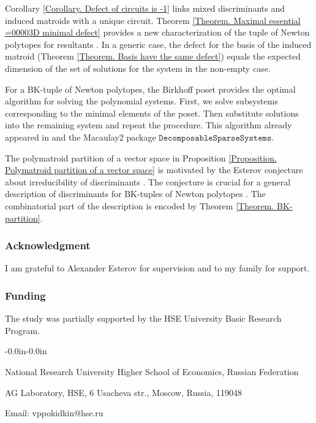 \documentclass[11pt]{article}
\theoremstyle{plain}
\theoremstyle{definition}
\theoremstyle{remark}
\theoremstyle{plain}
\theoremstyle{plain}
\theoremstyle{plain}
\theoremstyle{definition}
\begin{document}
Corollary \ref{Corollary. Defect of circuits is -1} links mixed discriminants
\cite{cattani_mixed_2013} and induced matroids with a unique circuit.
Theorem \ref{Theorem. Maximal essential =00003D minimal defect} provides
a new characterization of the tuple of Newton polytopes for resultants
\cite{sturmfels_newton_1994}. In a generic case, the defect for the
basis of the induced matroid (Theorem \ref{Theorem. Basis have the same defect})
equals the expected dimension of the set of solutions for the system
in the non-empty case.

For a BK-tuple of Newton polytopes, the Birkhoff poset provides the
optimal algorithm for solving the polynomial systems. First, we solve
subsystems corresponding to the minimal elements of the poset. Then
substitute solutions into the remaining system and repeat the procedure.
This algorithm already appeared in \cite{brysiewicz_solving_2021}
and the Macaulay2 package $\mathtt{DecomposableSparseSystems}$.

The polymatroid partition of a vector space in Proposition \ref{Proposition. Polymatroid partition of a vector space}
is motivated by the Esterov conjecture about irreducibility of discriminants
\cite{esterov_galois_2019,pokidkin_components_2025}. The conjecture
is crucial for a general description of discriminants for BK-tuples
of Newton polytopes \cite{pokidkin_components_2025}. The combinatorial
part of the description is encoded by Theorem \ref{Theorem. BK-partition}.

\subsubsection*{Acknowledgment}

I am grateful to Alexander Esterov for supervision and to my family
for support.

\subsubsection*{Funding}

The study was partially supported by the HSE University Basic Research
Program.

\begin{adjustwidth}{-0.0in}{-0.0in}
	\sloppy
	\printbibliography
	\fussy
\end{adjustwidth}

National Research University Higher School of Economics, Russian Federation

AG Laboratory, HSE, 6 Usacheva str., Moscow, Russia, 119048

\-

Email: vppokidkin@hse.ru
\end{document}
